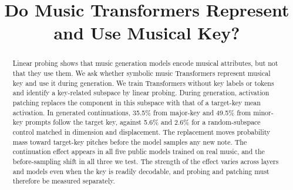 \documentclass{article}
\title{Do Music Transformers Represent and Use Musical Key?}
\begin{document}
\ninept
\maketitle

\setlength{\abovedisplayskip}{3pt plus 1pt minus 1pt}
\setlength{\belowdisplayskip}{3pt plus 1pt minus 1pt}
\setlength{\abovedisplayshortskip}{2pt plus 1pt}
\setlength{\belowdisplayshortskip}{2pt plus 1pt}

\makeatletter
\renewcommand{\section}{\@startsection{section}{1}{\z@}%
  {-6pt plus -1pt minus -1pt}{4pt plus 1pt}%
  {\reset@font\large\bf\centering}}
\renewcommand{\subsection}{\@startsection{subsection}{2}{\z@}%
  {-5pt plus -1pt minus -1pt}{2pt plus 1pt}%
  {\reset@font\normalsize\bf}}
\makeatother

\begin{abstract}
Linear probing shows that music generation models encode musical attributes, but not that they use them.
We ask whether symbolic music Transformers represent musical key and use it during generation.
We train Transformers without key labels or tokens and identify a key-related subspace by linear probing.
During generation, activation patching replaces the component in this subspace with that of a target-key mean activation.
In generated continuations, 35.5\% from major-key and 49.5\% from minor-key prompts follow the target key, against 5.6\% and 2.6\% for a random-subspace control matched in dimension and displacement.
The replacement moves probability mass toward target-key pitches before the model samples any new note.
The continuation effect appears in all five public models trained on real music, and the before-sampling shift in all three we test.
The strength of the effect varies across layers and models even when the key is readily decodable, and probing and patching must therefore be measured separately.
\end{abstract}
\end{document}
